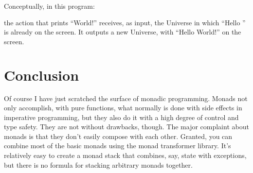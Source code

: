 Conceptually, in this program:

the action that prints ``World!'' receives, as input, the Universe in
which ``Hello '' is already on the screen. It outputs a new Universe,
with ``Hello World!'' on the screen.

\section{Conclusion}

Of course I have just scratched the surface of monadic programming.
Monads not only accomplish, with pure functions, what normally is done
with side effects in imperative programming, but they also do it with a
high degree of control and type safety. They are not without drawbacks,
though. The major complaint about monads is that they don't easily
compose with each other. Granted, you can combine most of the basic
monads using the monad transformer library. It's relatively easy to
create a monad stack that combines, say, state with exceptions, but
there is no formula for stacking arbitrary monads together.